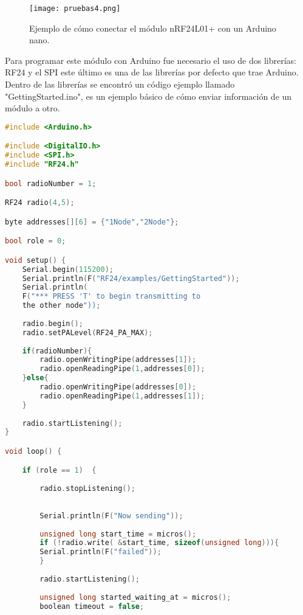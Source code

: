 \begin{figure}[H]
	\centering
	\texttt{[image: pruebas4.png]}
	\caption{Ejemplo de cómo conectar el módulo nRF24L01+ con un Arduino nano.}
\end{figure}

\par \noindent
Para programar este módulo con Arduino fue necesario el uso de dos librerías: RF24\cite{rf24} y el SPI este último es una de las librerías por defecto que trae Arduino. Dentro de las librerías se encontró un código ejemplo llamado "GettingStarted.ino", es un ejemplo básico de cómo enviar información de un módulo a otro.

\begin{lstlisting}[language=C++, caption={Codigo Ejemplo para módulo nRF24L01+}, captionpos=b]
#include <Arduino.h>

#include <DigitalIO.h>
#include <SPI.h>
#include "RF24.h"

bool radioNumber = 1;

RF24 radio(4,5);

byte addresses[][6] = {"1Node","2Node"};

bool role = 0;

void setup() {
	Serial.begin(115200);
	Serial.println(F("RF24/examples/GettingStarted"));
	Serial.println(
	F("*** PRESS 'T' to begin transmitting to 
	the other node"));
	
	radio.begin();
	radio.setPALevel(RF24_PA_MAX);
	
	if(radioNumber){
		radio.openWritingPipe(addresses[1]);
		radio.openReadingPipe(1,addresses[0]);
	}else{
		radio.openWritingPipe(addresses[0]);
		radio.openReadingPipe(1,addresses[1]);
	}
	
	radio.startListening();
}

void loop() {

	if (role == 1)  {
	
		radio.stopListening();                                    
		
		
		Serial.println(F("Now sending"));
		
		unsigned long start_time = micros();                      
		if (!radio.write( &start_time, sizeof(unsigned long))){
		Serial.println(F("failed"));
		}
		
		radio.startListening();                                   
		
		unsigned long started_waiting_at = micros();              
		boolean timeout = false;                                  
		

\end{lstlisting}
